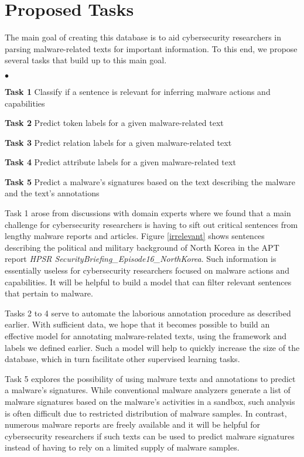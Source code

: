 \documentclass[11pt,a4paper]{article}
\newcommand{\squishlist}{
 \begin{list}{$\bullet$}
  { \setlength{\itemsep}{0pt}
     \setlength{\parsep}{3pt}
     \setlength{\topsep}{3pt}
     \setlength{\partopsep}{0pt}
     \setlength{\leftmargin}{1.5em}
     \setlength{\labelwidth}{1em}
     \setlength{\labelsep}{0.5em} } }
\newcommand{\squishend}{
  \end{list}  }
\begin{document}
\section{Proposed Tasks}

The main goal of creating this database is to aid cybersecurity researchers in parsing malware-related texts for important information. To this end, we propose several tasks that build up to this main goal.

\squishlist %
\item [\bf Task 1]	Classify if a sentence is relevant for inferring malware actions and capabilities
\item [\bf Task 2]	Predict token labels for a given malware-related text
\item [\bf Task 3]	Predict relation labels for a given malware-related text
\item [\bf Task 4]	Predict attribute labels for a given malware-related text
\item [\bf Task 5]	Predict a malware's signatures based on the text describing the malware and the text's annotations
\squishend %

Task 1 arose from discussions with domain experts where we found that a main challenge for cybersecurity researchers is having to sift out critical sentences from lengthy malware reports and articles. Figure \ref{irrelevant} shows sentences describing the political and military background of North Korea in the APT report \emph{HPSR SecurityBriefing\_Episode16\_NorthKorea}. Such information is essentially useless for cybersecurity researchers focused on malware actions and capabilities. It will be helpful to build a model that can filter relevant sentences that pertain to malware.

Tasks 2 to 4 serve to automate the laborious annotation procedure as described earlier. With sufficient data, we hope that it becomes possible to build an effective model for annotating malware-related texts, using the framework and labels we defined earlier. Such a model will help to quickly increase the size of the database, which in turn facilitate other supervised learning tasks.

Task 5 explores the possibility of using malware texts and annotations to predict a malware's signatures. While conventional malware analyzers generate a list of malware signatures based on the malware's activities in a sandbox, such analysis is often difficult due to restricted distribution of malware samples. In contrast, numerous malware reports are freely available and it will be helpful for cybersecurity researchers if such texts can be used to predict malware signatures instead of having to rely on a limited supply of malware samples.
\end{document}
